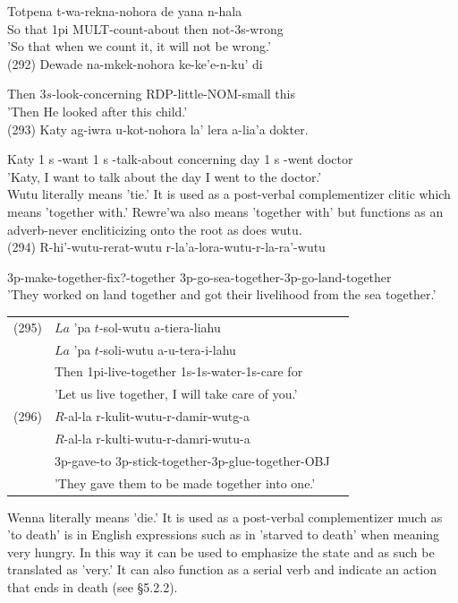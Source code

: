 \documentclass[10pt]{article}
\begin{document}
Totpena t-wa-rekna-nohora de yana n-hala\\
So that 1pi MULT-count-about then not-3s-wrong\\
'So that when we count it, it will not be wrong.'\\
(292) Dewade na-mkek-nohora ke-ke'e-n-ku' di

Then \(3 s\)-look-concerning RDP-little-NOM-small this\\
'Then He looked after this child.'\\
(293) Katy ag-iwra u-kot-nohora la' lera a-lia'a dokter.

Katy 1 s -want 1 s -talk-about concerning day 1 s -went doctor\\
'Katy, I want to talk about the day I went to the doctor.'\\
Wutu literally means 'tie.' It is used as a post-verbal complementizer clitic which means 'together with.' Rewre'wa also means 'together with' but functions as an adverb-never encliticizing onto the root as does wutu.\\
(294) R-hi'-wutu-rerat-wutu r-la'a-lora-wutu-r-la-ra'-wutu

3p-make-together-fix?-together 3p-go-sea-together-3p-go-land-together\\
'They worked on land together and got their livelihood from the sea together.'

\begin{center}
\begin{tabular}{lll}
(295) & \(L a\) 'pa \(t\)-sol-wutu a-tiera-liahu \\
 & \(L a\) 'pa \(t\)-soli-wutu a-u-tera-i-lahu \\
 & Then 1pi-live-together 1s-1s-water-1s-care for \\
 & 'Let us live together, I will take care of you.' \\
(296) & \(R\)-al-la r-kulit-wutu-r-damir-wutg-a \\
 & \(R\)-al-la r-kulti-wutu-r-damri-wutu-a \\
 & 3p-gave-to 3p-stick-together-3p-glue-together-OBJ \\
 & 'They gave them to be made together into one.' \\
\end{tabular}
\end{center}

Wenna literally means 'die.' It is used as a post-verbal complementizer much as 'to death' is in English expressions such as in 'starved to death' when meaning very hungry. In this way it can be used to emphasize the state and as such be translated as 'very.' It can also function as a serial verb and indicate an action that ends in death (see §5.2.2).
\end{document}
